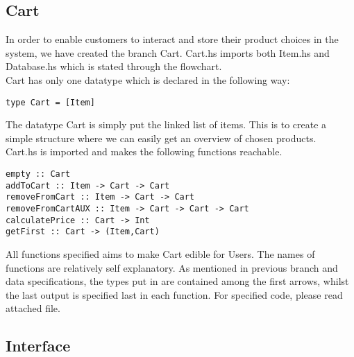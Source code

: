 \documentclass[11pt]{article}
\begin{document}
\subsection{Cart}
In order to enable customers to interact and store their product choices in the system, we have created the branch Cart. Cart.hs imports both Item.hs and Database.hs which is stated through the flowchart.\\
Cart has only one datatype which is declared in the following way:\\
\begin{lstlisting}
type Cart = [Item]
\end{lstlisting}
The datatype Cart is simply put the linked list of items. This is to create a simple structure where we can easily get an overview of chosen products.\\
Cart.hs is imported and makes the following functions reachable.\\
\begin{lstlisting}
empty :: Cart
addToCart :: Item -> Cart -> Cart
removeFromCart :: Item -> Cart -> Cart
removeFromCartAUX :: Item -> Cart -> Cart -> Cart
calculatePrice :: Cart -> Int
getFirst :: Cart -> (Item,Cart)
\end{lstlisting}
All functions specified aims to make Cart edible for Users. The names of functions are relatively self explanatory. As mentioned in previous branch and data specifications, the types put in are contained among the first arrows, whilst the last output is specified last in each function. For specified code, please read attached file.
\subsection{Interface}
\end{document}
